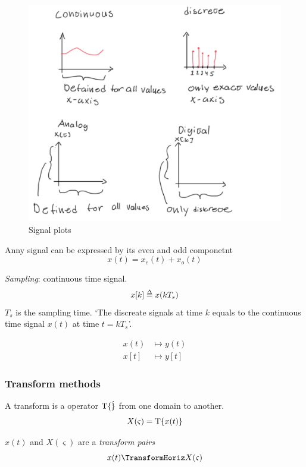 \begin{figure}[!ht]
    \centering
    \includegraphics[width=12cm]{image/caractaristic-signal-plots.pdf}
    \caption{Signal plots}
\end{figure}

Anny signal can be expressed by its even and odd componetnt
\begin{equation}
    x(t) = x_e(t) + x_o(t)
\end{equation}

\textit{Sampling}: continuous time signal.
\begin{equation}
    x[k] \delequal x(k T_s)
\end{equation}
$T_s$ is the sampling time.
`The discreate signals at time $k$ equals to 
the continuous time signal $x(t)$ at time $t = kT_s$'.

\begin{align}
    x(t)  &\mapsto y(t)    \\
    x[t]  &\mapsto y[t]
\end{align}


\subsubsection{Transform methods}
A transform is a operator $\mathrm{T}\{ \dot \}$ from one domain to another.
\begin{equation*}
    X(\varsigma) = \mathrm{T}\{ x(t) \}
\end{equation*}

$x(t)$ and $X(\varsigma)$ are a \textit{transform pairs}
\begin{equation*}
    x(t) \TransformHoriz X(\varsigma)
\end{equation*}

